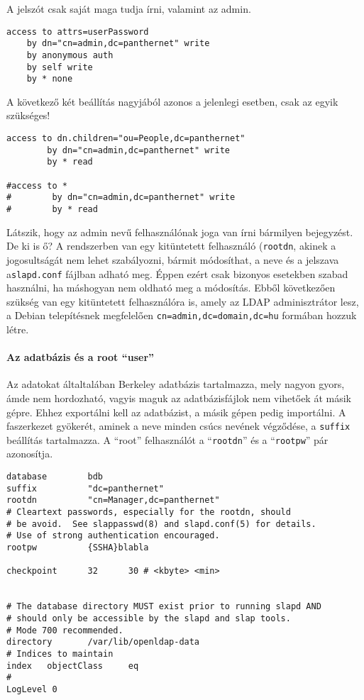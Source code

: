 A jelszót csak saját maga tudja írni, valamint az admin.

\begin{Verbatim}[frame=single]
access to attrs=userPassword
    by dn="cn=admin,dc=panthernet" write
    by anonymous auth
    by self write
    by * none
\end{Verbatim}    

A következő két beállítás nagyjából azonos a jelenlegi esetben, csak az egyik szükséges!

\begin{Verbatim}[frame=single]
access to dn.children="ou=People,dc=panthernet"
        by dn="cn=admin,dc=panthernet" write
        by * read

#access to *
#        by dn="cn=admin,dc=panthernet" write
#        by * read
\end{Verbatim}


Látszik, hogy az admin nevű felhasználónak joga van írni bármilyen bejegyzést. De ki is ő? A rendszerben van egy
kitüntetett felhasználó (\texttt{rootdn}, akinek a jogosultságát nem lehet szabályozni, bármit módosíthat, a
neve és a jelszava a\texttt{slapd.conf} fájlban adható meg. Éppen ezért csak bizonyos esetekben szabad használni, ha
máshogyan nem oldható meg a módosítás. Ebből következően szükség van egy kitüntetett felhasználóra is, amely az LDAP
adminisztrátor lesz, a Debian telepítésnek megfelelően \texttt{cn=admin,dc=domain,dc=hu} formában hozzuk létre.


\paragraph{Az adatbázis és a root ``user''} Az adatokat általtalában Berkeley adatbázis tartalmazza, mely nagyon
gyors, ámde nem hordozható, vagyis maguk az adatbázisfájlok nem vihetőek át másik gépre. Ehhez exportálni kell az
adatbázist, a másik gépen pedig importálni. A faszerkezet gyökerét, aminek a neve minden csúcs nevének végződése, a
\texttt{suffix} beállítás tartalmazza. A ``root'' felhasználót a ``\texttt{rootdn}'' és a ``\texttt{rootpw}'' pár
azonosítja.

\begin{Verbatim}[frame=single]
database        bdb
suffix          "dc=panthernet"
rootdn          "cn=Manager,dc=panthernet"
# Cleartext passwords, especially for the rootdn, should
# be avoid.  See slappasswd(8) and slapd.conf(5) for details.
# Use of strong authentication encouraged.
rootpw          {SSHA}blabla

checkpoint      32      30 # <kbyte> <min>


# The database directory MUST exist prior to running slapd AND
# should only be accessible by the slapd and slap tools.
# Mode 700 recommended.
directory       /var/lib/openldap-data
# Indices to maintain
index   objectClass     eq
#
LogLevel 0
\end{Verbatim}


